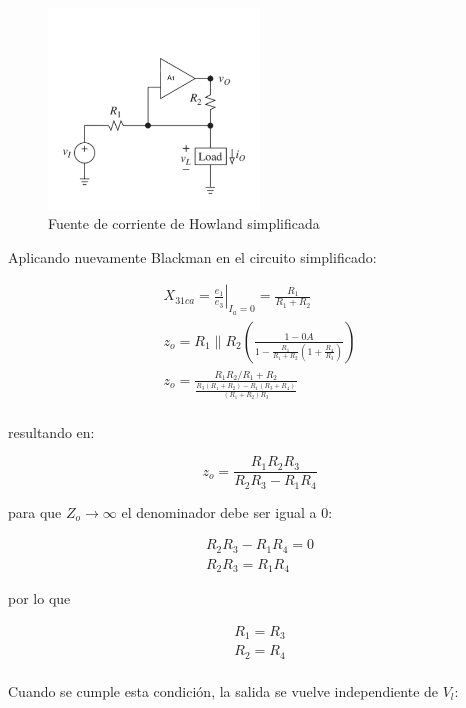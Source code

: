 \begin{figure}[ht]
    \centering
    \includegraphics[width=0.5\textwidth]{src/images/fuente-corriente-howland-simplificado.png}
    \caption{Fuente de corriente de Howland simplificada}
    \label{fig:mt-fuente-corriente-howland-simplificado}    
\end{figure}

Aplicando nuevamente Blackman en el circuito simplificado:

\begin{align}
    X_{31ca} = \left. \frac{e_1}{e_3} \right|_{I_a=0} = \frac{R_1}{R_1 + R_2} \\
    z_o = R_1 \parallel R_2 (\frac{1 - 0A}{1 - \frac{R_1}{R_1 + R_2}(1 + \frac{R_4}{R_3})}) \\
    z_o = \frac{R_1 R_2 / R_1 + R_2}{\frac{R_3(R_1 + R_2) - R_1(R_3 + R_4)}{(R_1 + R_2)R_3}} \\
\end{align}

resultando en:

\begin{equation}
    \boxed{z_o = \frac{R_1 R_2 R_3}{R_2 R_3 - R_1 R_4}}
\end{equation}

para que $Z_o \rightarrow\infty$ el denominador debe ser igual a 0:

\begin{align*}
    R_2 R_3 - R_1 R_4 = 0 \\
    R_2 R_3 = R_1 R_4
\end{align*}

por lo que 

\begin{align}
    R_1 = R_3 \\
    R_2 = R_4 \\
\end{align}

Cuando se cumple esta condición, la salida se vuelve independiente de $V_l$:


